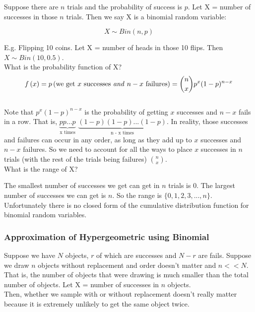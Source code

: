 \documentclass[12pt, letterpaper]{article}
\begin{document}
Suppose there are \(n\) trials and the probability of success is \(p\). Let X = number of successes in those \(n\) trials. Then we say X is a binomial random variable:

\begin{equation}
X \sim Bin(n, p)
\end{equation}

E.g. Flipping 10 coins. Let X = number of heads in those 10 flips. Then \(X \sim Bin(10, 0.5)\).\\

What is the probability function of X?
\begin{equation}
f\left(x\right) = p\left(\text{we get $x$ successes \emph{and} $n - x$ failures}\right) = {{n} \choose {x}} p^x (1 - p)^{n - x}
\end{equation}\\

Note that \(p^x (1 - p)^{n-x}\) is the probability of getting \(x\) successes and \(n - x\) fails in a row. That is, \(\underbrace{p p ... p}_\text{x times}\) \(\underbrace{(1 - p) (1 - p) ... (1 - p)}_\text{n - x times}\). In reality, those successes and failures can occur in any order, as long as they add up to \(x\) successes and \(n - x\) failures. So we need to account for all the ways to place \(x\) successes in \(n\) trials (with the rest of the trials being failures) \({{n} \choose {x}}\).\\

What is the range of X?

The smallest number of successes we get can get in \(n\) trials is 0. The largest number of successes we can get is \(n\). So the range is \(\{0, 1, 2, 3, ..., n\}\).\\

Unfortunately there is no closed form of the cumulative distribution function for binomial random variables.

\subsubsection{Approximation of Hypergeometric using Binomial}
Suppose we have \(N\) objects, \(r\) of which are successes and \(N - r\) are fails. Suppose we draw \(n\) objects without replacement and order doesn't matter and \(n << N\). That is, the number of objects that were drawing is much smaller than the total number of objects. Let X = number of successes in \(n\) objects.\\

Then, whether we sample with or without replacement doesn't really matter because it is extremely unlikely to get the same object twice.\\
\end{document}
